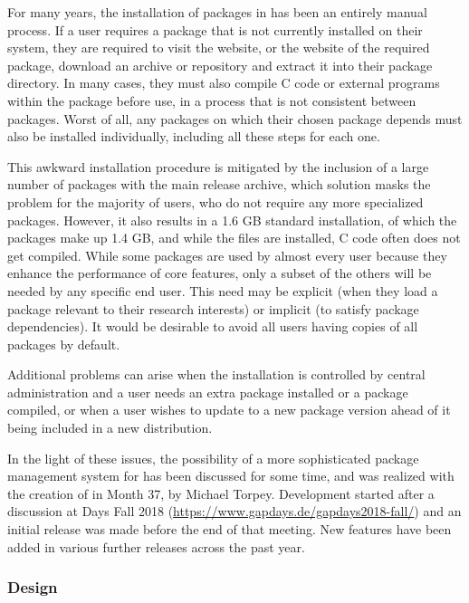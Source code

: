 For many years, the installation of packages in \GAP has been an
entirely manual process.  If a user requires a package that is not
currently installed on their system, they are required to visit the
\GAP website, or the website of the required package, download an
archive or repository and extract it into their package directory.  In
many cases, they must also compile C code or external programs
within the package before use, in a process that is not consistent
between packages.  Worst of all, any packages on which their chosen
package depends must also be installed individually, including all
these steps for each one.

This awkward installation procedure is mitigated by the inclusion of a
large number of packages with the main release archive, which solution
masks the problem for the majority of users, who do not require any
more specialized packages.  However, it also results in a 1.6 GB
standard installation, of which the packages make up 1.4 GB, and while
the files are installed, C code often does not get compiled. While
some packages are used by almost every \GAP user because they enhance
the performance of core \GAP features, only a subset of the others
will be needed by any specific end user. This need may be explicit (when
they load a package relevant to their research interests) or implicit
(to satisfy package dependencies). It would be desirable to avoid all
users having copies of all packages by default.

Additional problems can arise when the \GAP installation is controlled
by central administration and a user needs an extra package installed or a
package compiled, or when a user wishes to update to a new package
version ahead of it being included in a new \GAP distribution.


In the light of these issues, the possibility of a more sophisticated
package management system for \GAP has been discussed for some time,
and was realized with the creation of 
\cite{PackageManager} in Month 37, by Michael Torpey.  Development
started after a discussion at \GAP Days Fall 2018
(\url{https://www.gapdays.de/gapdays2018-fall/}) and an initial
release was made before the end of that meeting.  New features have
been added in various further releases across the past year.

\subsubsection{Design}

